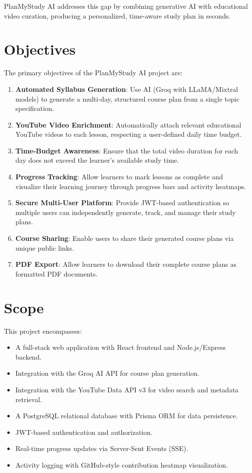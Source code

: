 \documentclass[12pt,a4paper]{report}
\begin{document}
PlanMyStudy AI addresses this gap by combining generative AI with educational video curation, producing a personalized, time-aware study plan in seconds.

\section{Objectives}
The primary objectives of the PlanMyStudy AI project are:

\begin{enumerate}[noitemsep]
    \item \textbf{Automated Syllabus Generation}: Use AI (Groq with LLaMA/Mixtral models) to generate a multi-day, structured course plan from a single topic specification.
    \item \textbf{YouTube Video Enrichment}: Automatically attach relevant educational YouTube videos to each lesson, respecting a user-defined daily time budget.
    \item \textbf{Time-Budget Awareness}: Ensure that the total video duration for each day does not exceed the learner's available study time.
    \item \textbf{Progress Tracking}: Allow learners to mark lessons as complete and visualize their learning journey through progress bars and activity heatmaps.
    \item \textbf{Secure Multi-User Platform}: Provide JWT-based authentication so multiple users can independently generate, track, and manage their study plans.
    \item \textbf{Course Sharing}: Enable users to share their generated course plans via unique public links.
    \item \textbf{PDF Export}: Allow learners to download their complete course plans as formatted PDF documents.
\end{enumerate}

\section{Scope}
This project encompasses:

\begin{itemize}[noitemsep]
    \item A full-stack web application with React frontend and Node.js/Express backend.
    \item Integration with the Groq AI API for course plan generation.
    \item Integration with the YouTube Data API v3 for video search and metadata retrieval.
    \item A PostgreSQL relational database with Prisma ORM for data persistence.
    \item JWT-based authentication and authorization.
    \item Real-time progress updates via Server-Sent Events (SSE).
    \item Activity logging with GitHub-style contribution heatmap visualization.
\end{itemize}
\end{document}

